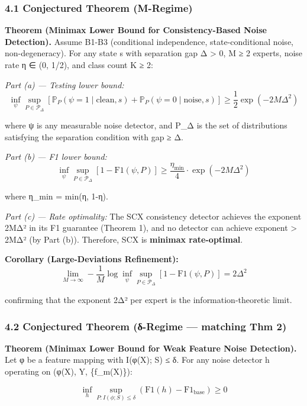 \documentclass[
  12pt,
]{article}
\begin{document}
\subsubsection{4.1 Conjectured Theorem
(M-Regime)}\label{conjectured-theorem-m-regime}

\textbf{Theorem (Minimax Lower Bound for Consistency-Based Noise
Detection).} Assume B1-B3 (conditional independence, state-conditional
noise, non-degeneracy). For any state s with separation gap Δ
\textgreater{} 0, M ≥ 2 experts, noise rate η ∈ (0, 1/2), and class
count K ≥ 2:

\emph{Part (a) --- Testing lower bound:}
\[\inf_{\psi} \sup_{P \in \mathcal{P}_{\Delta}} \left[ \mathbb{P}_P(\psi=1 \mid \text{clean}, s) + \mathbb{P}_P(\psi=0 \mid \text{noise}, s) \right] \geq \frac{1}{2} \exp\!\left(-2M\Delta^2\right)\]

where ψ is any measurable noise detector, and P\_Δ is the set of
distributions satisfying the separation condition with gap ≥ Δ.

\emph{Part (b) --- F1 lower bound:}
\[\inf_{\psi} \sup_{P \in \mathcal{P}_{\Delta}} \left[1 - \text{F1}(\psi, P)\right] \geq \frac{\eta_{\min}}{4} \cdot \exp\!\left(-2M\Delta^2\right)\]

where η\_min = min(η, 1-η).

\emph{Part (c) --- Rate optimality:} The SCX consistency detector
achieves the exponent 2MΔ² in its F1 guarantee (Theorem 1), and no
detector can achieve exponent \textgreater{} 2MΔ² (by Part (b)).
Therefore, SCX is \textbf{minimax rate-optimal}.

\textbf{Corollary (Large-Deviations Refinement):}
\[\lim_{M \to \infty} -\frac{1}{M} \log \inf_{\psi} \sup_{P \in \mathcal{P}_{\Delta}} \left[1 - \text{F1}(\psi, P)\right] = 2\Delta^2\]

confirming that the exponent 2Δ² per expert is the information-theoretic
limit.

\subsubsection{4.2 Conjectured Theorem (δ-Regime --- matching Thm
2)}\label{conjectured-theorem-ux3b4-regime-matching-thm-2}

\textbf{Theorem (Minimax Lower Bound for Weak Feature Noise Detection).}
Let φ be a feature mapping with I(φ(X); S) ≤ δ. For any noise detector h
operating on (φ(X), Y, \{f\_m(X)\}):

\[\inf_{h} \sup_{P: I(\phi;S) \leq \delta} \left(\text{F1}(h) - \text{F1}_{\text{base}}\right) \geq 0\]
\end{document}
